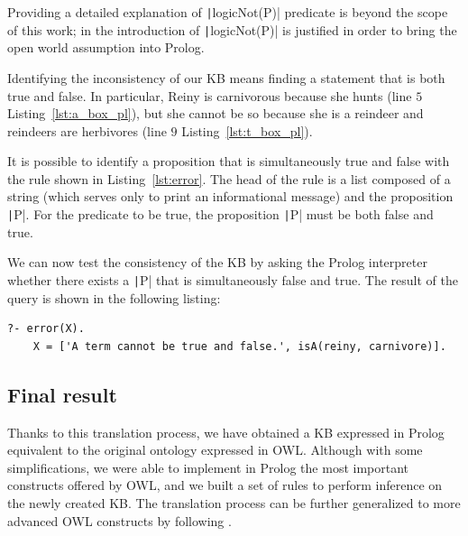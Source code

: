 Providing a detailed explanation of \texttt|logicNot(P)| predicate is beyond the scope of this work; in \cite{samuel2008translating} the introduction of \texttt|logicNot(P)| is justified in order to bring the open world assumption into Prolog.

\begin{listing}[h]
	\caption{Disjoint classes}
	\label{lst:disjoint}
\end{listing}

Identifying the inconsistency of our KB means finding a statement that is both true and false. In particular, Reiny is carnivorous because she hunts (line $5$ Listing~\ref{lst:a_box_pl}), but she cannot be so because she is a reindeer and reindeers are herbivores (line $9$ Listing~\ref{lst:t_box_pl}).

It is possible to identify a proposition that is simultaneously true and false with the rule shown in Listing~\ref{lst:error}. The head of the rule is a list composed of a string (which serves only to print an informational message) and the proposition \texttt|P|. For the predicate to be true, the proposition \texttt|P| must be both false and true.
\begin{listing}[h]
	\caption{Error rule}
	\label{lst:error}
\end{listing}

We can now test the consistency of the KB by asking the Prolog interpreter whether there exists a \texttt|P| that is simultaneously false and true. The result of the query is shown in the following listing:
\begin{center}
	\vspace{-.1cm}
	\begin{minipage}{.95\linewidth}
		\begin{verbatim}
?- error(X).
    X = ['A term cannot be true and false.', isA(reiny, carnivore)].
		\end{verbatim}
	\end{minipage}
\end{center}

\subsection{Final result}
Thanks to this translation process, we have obtained a KB expressed in Prolog equivalent to the original ontology expressed in OWL. Although with some simplifications, we were able to implement in Prolog the most important constructs offered by OWL, and we built a set of rules to perform inference on the newly created KB. The translation process can be further generalized to more advanced OWL constructs by following \cite{samuel2008translating}.

